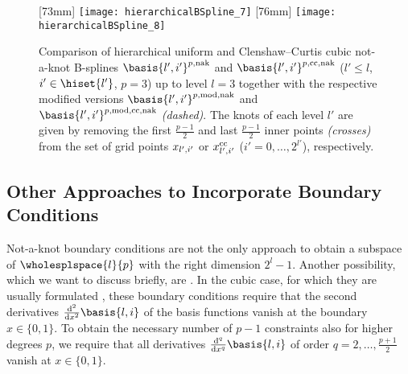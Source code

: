 \begin{figure}
  [73mm]{%
    \texttt{[image: hierarchicalBSpline\_7]}%
  }%
  \hfill
  [76mm]{%
    \texttt{[image: hierarchicalBSpline\_8]}%
  }%
  \caption{%
    Comparison of hierarchical uniform and Clenshaw--Curtis cubic not-a-knot
    B-splines $\basis{l',i'}^{p,\notaknot}$ and
    $\basis{l',i'}^{p,\clenshawcurtis,\notaknot}$
    ($l ' \le l$, $i' \in \hiset{l'}$, $p = 3$) up to level $l = 3$
    together with the respective modified versions
    $\basis{l',i'}^{p,\modified,\notaknot}$ and
    $\basis{l',i'}^{p,\modified,\clenshawcurtis,\notaknot}$
    \emph{(dashed)}.
    The knots of each level $l'$ are given by removing the
    first $\tfrac{p-1}{2}$ and last $\tfrac{p-1}{2}$
    inner points \emph{(crosses)}
    from the set of grid points $x_{l',i'}$ or
    $x_{l',i'}^{\mathrm{cc}}$
    ($i' = 0, \dotsc, 2^{l'}$), respectively.%
  }%
\end{figure}



\subsection{Other Approaches to Incorporate Boundary Conditions}
\label{sec:324naturalBoundary}

Not-a-knot boundary conditions are not the only approach
to obtain a subspace of $\wholesplspace{l}{p}$ with the right dimension $2^l - 1$.
Another possibility, which we want to discuss briefly, are
.
In the cubic case, for which they are usually formulated
\cite{Hoellig13Approximation},
these boundary conditions require that the
second derivatives $\frac{\diff^2}{\dx^2} \basis{l,i}$ of the
basis functions vanish at the boundary $x \in \{0, 1\}$.
To obtain the necessary number of $p - 1$ constraints also
for higher degrees $p$,
we require that all derivatives
$\frac{\diff^q}{\dx^q} \basis{l,i}$ of order
$q = 2, \dotsc, \tfrac{p+1}{2}$ vanish at $x \in \{0, 1\}$.

